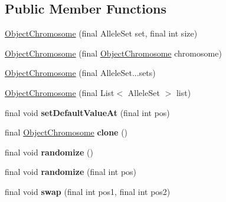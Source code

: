 \subsection*{Public Member Functions}
\begin{DoxyCompactItemize}
\item 
\hyperlink{classjenes_1_1chromosome_1_1_object_chromosome_a5af7d34bc1f7260dca1dc5c38135f4a4}{Object\-Chromosome} (final Allele\-Set set, final int size)
\item 
\hyperlink{classjenes_1_1chromosome_1_1_object_chromosome_a59e25d20fb54d53ff2b4adc53177d7d2}{Object\-Chromosome} (final \hyperlink{classjenes_1_1chromosome_1_1_object_chromosome}{Object\-Chromosome} chromosome)
\item 
\hyperlink{classjenes_1_1chromosome_1_1_object_chromosome_aba090ada4d0f24caaf6f68cfed7800f0}{Object\-Chromosome} (final Allele\-Set...\-sets)
\item 
\hyperlink{classjenes_1_1chromosome_1_1_object_chromosome_aa6c8dcc77a9129f9634ea02f19d5a968}{Object\-Chromosome} (final List$<$ Allele\-Set $>$ list)
\item 
\hypertarget{classjenes_1_1chromosome_1_1_object_chromosome_ad4b8a3ca38d15a8170b63464149b37aa}{final void {\bfseries set\-Default\-Value\-At} (final int pos)}\label{classjenes_1_1chromosome_1_1_object_chromosome_ad4b8a3ca38d15a8170b63464149b37aa}

\item 
\hypertarget{classjenes_1_1chromosome_1_1_object_chromosome_a4aa8eeaac6a20b30c260bfda00c78fe2}{final \hyperlink{classjenes_1_1chromosome_1_1_object_chromosome}{Object\-Chromosome} {\bfseries clone} ()}\label{classjenes_1_1chromosome_1_1_object_chromosome_a4aa8eeaac6a20b30c260bfda00c78fe2}

\item 
\hypertarget{classjenes_1_1chromosome_1_1_object_chromosome_a26a9d9d7eb049ff88c3321728fd9de07}{final void {\bfseries randomize} ()}\label{classjenes_1_1chromosome_1_1_object_chromosome_a26a9d9d7eb049ff88c3321728fd9de07}

\item 
\hypertarget{classjenes_1_1chromosome_1_1_object_chromosome_aac077d08ae00b9805797d5848a10c1f4}{final void {\bfseries randomize} (final int pos)}\label{classjenes_1_1chromosome_1_1_object_chromosome_aac077d08ae00b9805797d5848a10c1f4}

\item 
\hypertarget{classjenes_1_1chromosome_1_1_object_chromosome_af85db410fecd769993c248f94396dd53}{final void {\bfseries swap} (final int pos1, final int pos2)}\label{classjenes_1_1chromosome_1_1_object_chromosome_af85db410fecd769993c248f94396dd53}


\end{DoxyCompactItemize}
